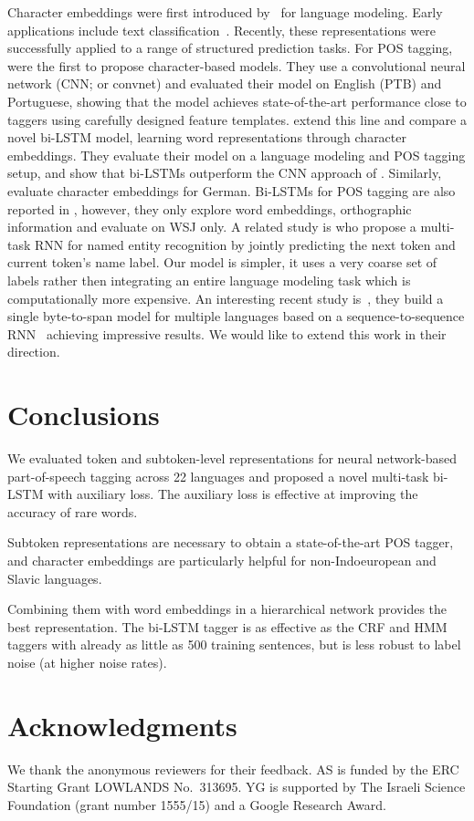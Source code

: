 \documentclass[11pt]{article}
\begin{document}
Character embeddings were first introduced by~ for language modeling. Early applications include text classification~\cite{chrupala:2013,zhang:ea:2015:char}.  Recently, these representations were successfully applied to a range of structured prediction tasks. For POS tagging, 
 were the first to propose character-based models. 
They use a convolutional neural network (CNN; or convnet) and evaluated their model on English (PTB) and Portuguese, showing that the model achieves 
state-of-the-art performance close to taggers using carefully designed feature templates.  extend this line and compare 
a novel bi-LSTM model, learning word representations through character embeddings. They evaluate their model on a language modeling and POS tagging setup,
and show that bi-LSTMs outperform the CNN approach of . Similarly,  evaluate character embeddings for German. 
Bi-LSTMs for POS tagging are also reported in , however, they only explore word embeddings, 
orthographic information and evaluate on WSJ only. 
A related study is  who propose a multi-task RNN for named entity recognition by jointly predicting the
next token and current token's name label. Our model is simpler, it uses a very coarse set of labels rather then integrating an entire language modeling
task which is computationally more expensive. An interesting recent study is~, they build a single byte-to-span model for multiple
languages based on a sequence-to-sequence RNN~\cite{sutskever:ea:2014} achieving impressive results. We would like to extend this work in their direction.



\section{Conclusions}
We evaluated token and subtoken-level representations for neural network-based 
part-of-speech tagging across 22 languages and proposed a novel multi-task bi-LSTM
with auxiliary loss. The auxiliary loss is effective at improving the accuracy of rare words. 

Subtoken representations are necessary to obtain a state-of-the-art POS 
tagger, and character embeddings are particularly helpful for non-Indoeuropean and Slavic languages. 

Combining them with word embeddings in a hierarchical network provides the best representation.
The bi-LSTM tagger is as effective as the CRF and HMM taggers with already as little as 500 training sentences,
but is less robust to label noise (at higher noise rates). 




\section*{Acknowledgments}

We thank the anonymous reviewers for their feedback.  
AS is funded by the ERC Starting Grant
LOWLANDS No.\ 313695. YG is supported by The Israeli Science Foundation (grant number 1555/15) and a Google Research Award. 





\end{document}
